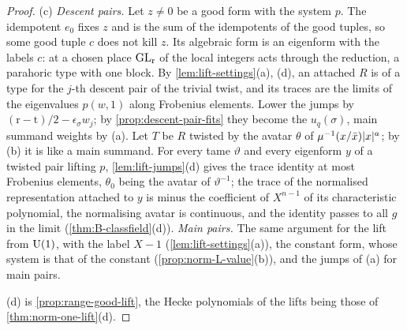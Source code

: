 \begin{proof}
(c) \emph{Descent pairs.} Let $z\ne0$ be a good form with the system $p$. The idempotent $e_0$ fixes $z$ and is the sum of the idempotents of the good tuples, so some good tuple $c$ does not kill $z$. Its algebraic form is an
eigenform with the labels $c$: at a chosen place $\operatorname{GL}_{\mathrm r}$ of the local integers acts through the reduction, a parahoric type with one block. By \cref{lem:lift-settings}(a), (d), an attached $R$ is of a type for the $j$-th descent
pair of the trivial twist, and its traces are the limits of the eigenvalues $p(w,1)$ along Frobenius elements. Lower the jumps by $(\mathrm r-\mathrm t)/2-\epsilon_\sigma w_j$; by \cref{prop:descent-pair-fits} they become the $u_q(\sigma)$, main summand weights by (a).
Let $T$ be $R$ twisted by the avatar $\theta$ of $\mu^{-1}(x/\bar x)\lvert x\rvert^a$; by (b) it is like a main summand. For every tame $\vartheta$ and every eigenform $y$ of a twisted pair lifting $p$, \cref{lem:lift-jumps}(d) gives the trace identity at
most Frobenius elements, $\theta_0$ being the avatar of $\vartheta^{-1}$; the trace of the normalised representation attached to $y$ is minus the coefficient of $X^{n-1}$ of its characteristic polynomial, the normalising avatar is
continuous, and the identity passes to all $g$ in the limit (\cref{thm:B-classfield}(d)). \emph{Main pairs.} The same argument for the lift from $\operatorname{U}(1)$, with the label $X-1$ (\cref{lem:lift-settings}(a)), the constant form, whose
system is that of the constant (\cref{prop:norm-L-value}(b)), and the jumps of (a) for main pairs.

(d) is \cref{prop:range-good-lift}, the Hecke polynomials of the lifts being those of \cref{thm:norm-one-lift}(d).
\end{proof}
